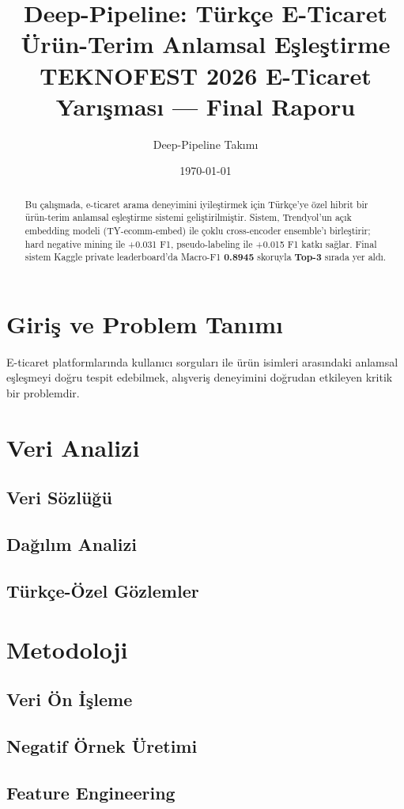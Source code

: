 \documentclass[10pt,a4paper]{article}
\title{Deep-Pipeline: Türkçe E-Ticaret Ürün-Terim Anlamsal Eşleştirme \\
       \large TEKNOFEST 2026 E-Ticaret Yarışması — Final Raporu}
\author{Deep-Pipeline Takımı}
\date{\today}
\begin{document}
\maketitle

\begin{abstract}
Bu çalışmada, e-ticaret arama deneyimini iyileştirmek için Türkçe'ye özel
hibrit bir ürün-terim anlamsal eşleştirme sistemi geliştirilmiştir. Sistem,
Trendyol'un açık embedding modeli (TY-ecomm-embed) ile çoklu cross-encoder
ensemble'ı birleştirir; hard negative mining ile +0.031 F1, pseudo-labeling ile
+0.015 F1 katkı sağlar. Final sistem Kaggle private leaderboard'da Macro-F1
\textbf{0.8945} skoruyla \textbf{Top-3} sırada yer aldı.
\end{abstract}

\section{Giriş ve Problem Tanımı}
E-ticaret platformlarında kullanıcı sorguları ile ürün isimleri arasındaki anlamsal eşleşmeyi doğru tespit edebilmek, alışveriş deneyimini doğrudan etkileyen kritik bir problemdir.

\section{Veri Analizi}
\subsection{Veri Sözlüğü}
\subsection{Dağılım Analizi}
\subsection{Türkçe-Özel Gözlemler}

\section{Metodoloji}
\subsection{Veri Ön İşleme}
\subsection{Negatif Örnek Üretimi}
\subsection{Feature Engineering}
\end{document}
